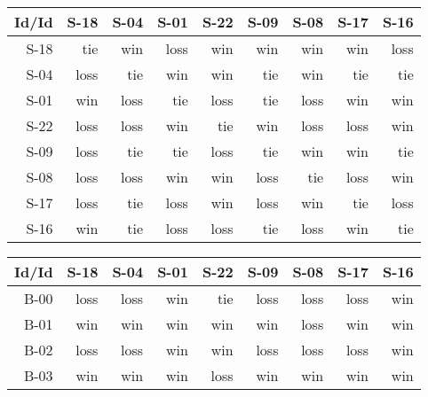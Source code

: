 \begin{tabular}{ | r | r | r | r | r | r | r | r | r | }
    \hline
        Id/Id  &   S-18  &   S-04  &   S-01  &   S-22  &   S-09  &   S-08  &   S-17  &   S-16  \\
    \hline
    \hline
         S-18  &    tie  &    win  &   loss  &    win  &    win  &    win  &    win  &   loss  \\
    \hline
         S-04  &   loss  &    tie  &    win  &    win  &    tie  &    win  &    tie  &    tie  \\
    \hline
         S-01  &    win  &   loss  &    tie  &   loss  &    tie  &   loss  &    win  &    win  \\
    \hline
         S-22  &   loss  &   loss  &    win  &    tie  &    win  &   loss  &   loss  &    win  \\
    \hline
         S-09  &   loss  &    tie  &    tie  &   loss  &    tie  &    win  &    win  &    tie  \\
    \hline
         S-08  &   loss  &   loss  &    win  &    win  &   loss  &    tie  &   loss  &    win  \\
    \hline
         S-17  &   loss  &    tie  &   loss  &    win  &   loss  &    win  &    tie  &   loss  \\
    \hline
         S-16  &    win  &    tie  &   loss  &   loss  &    tie  &   loss  &    win  &    tie  \\
    \hline
\end{tabular}


\begin{tabular}{ | r | r | r | r | r | r | r | r | r | }
    \hline
        Id/Id  &   S-18  &   S-04  &   S-01  &   S-22  &   S-09  &   S-08  &   S-17  &   S-16  \\
    \hline
    \hline
         B-00  &   loss  &   loss  &    win  &    tie  &   loss  &   loss  &   loss  &    win  \\
    \hline
         B-01  &    win  &    win  &    win  &    win  &    win  &   loss  &    win  &    win  \\
    \hline
         B-02  &   loss  &   loss  &    win  &    win  &   loss  &   loss  &   loss  &    win  \\
    \hline
         B-03  &    win  &    win  &    win  &   loss  &    win  &    win  &    win  &    win  \\
    \hline
\end{tabular}




